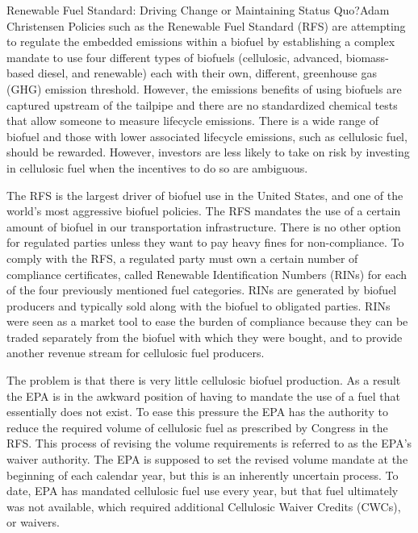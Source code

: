 \documentclass[10pt]{papertex}
\begin{document}
\begin{news}{2}{Renewable Fuel Standard: Driving Change or Maintaining Status 
    Quo?}{Adam Christensen}{}{}
Policies such as the Renewable Fuel Standard (RFS) are attempting to regulate 
the embedded emissions within a biofuel by establishing a complex mandate to 
use four different types of biofuels (cellulosic, advanced, biomass-based 
diesel, and renewable) each with their own, different, greenhouse gas (GHG) 
emission threshold. However, the emissions benefits of using biofuels are 
captured upstream of the tailpipe and there are no standardized chemical tests 
that allow someone to measure lifecycle emissions. There is a wide range of 
biofuel and those with lower associated lifecycle emissions, such as cellulosic 
fuel, should be rewarded. However, investors are less likely to take on risk 
by investing in cellulosic fuel when the incentives to do so are ambiguous.


The RFS is the largest driver of biofuel use in the United States, and one of 
the world’s most aggressive biofuel policies. The RFS mandates the use of a 
certain amount of biofuel in our transportation infrastructure. There is no 
other option for regulated parties unless they want to pay heavy fines for 
non-compliance. To comply with the RFS, a regulated party must own a certain 
number of compliance certificates, called Renewable Identification Numbers 
(RINs) for each of the four previously mentioned fuel categories. RINs are 
generated by biofuel producers and typically sold along with the biofuel to 
obligated parties. RINs were seen as a market tool to ease the burden of 
compliance because they can be traded separately from the biofuel with which 
they were bought, and to provide another revenue stream for cellulosic fuel 
producers.

The problem is that there is very little cellulosic biofuel production. As a 
result the EPA is in the awkward position of having to mandate the use of a 
fuel that essentially does not exist. To ease this pressure the EPA has the 
authority to reduce the required volume of cellulosic fuel as prescribed by 
Congress in the RFS. This process of revising the volume requirements is 
referred to as the EPA’s waiver authority. The EPA is supposed to set the 
revised volume mandate at the beginning of each calendar year, but this is an 
inherently uncertain process. To date, EPA has mandated cellulosic fuel use 
every year, but that fuel ultimately was not available, which required 
additional Cellulosic Waiver Credits (CWCs), or waivers.


\end{news}
\end{document}
